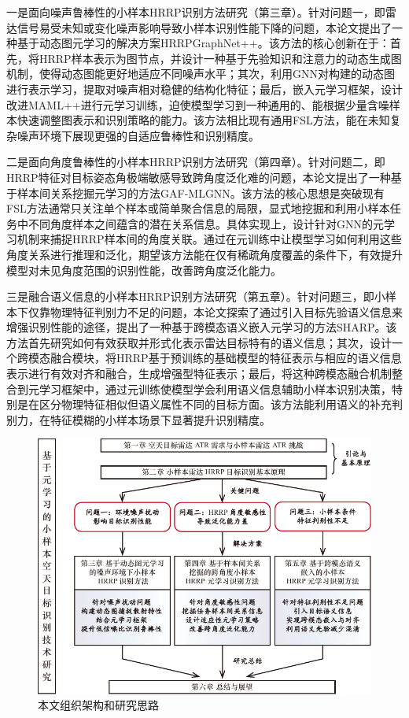 一是面向噪声鲁棒性的小样本HRRP识别方法研究（第三章）。针对问题一，即雷达信号易受未知或变化噪声影响导致小样本识别性能下降的问题，本论文提出了一种基于动态图元学习的解决方案HRRPGraphNet++。该方法的核心创新在于：首先，将HRRP样本表示为图节点，并设计一种基于先验知识和注意力的动态生成图机制，使得动态图能更好地适应不同噪声水平；其次，利用GNN对构建的动态图进行表示学习，提取对噪声相对稳健的结构化特征；最后，嵌入元学习框架，设计改进MAML++进行元学习训练，迫使模型学习到一种通用的、能根据少量含噪样本快速调整图表示和识别策略的能力。该方法相比现有通用FSL方法，能在未知复杂噪声环境下展现更强的自适应鲁棒性和识别精度。

二是面向角度鲁棒性的小样本HRRP识别方法研究（第四章）。针对问题二，即HRRP特征对目标姿态角极端敏感导致跨角度泛化难的问题，本论文提出了一种基于样本间关系挖掘元学习的方法GAF-MLGNN。该方法的核心思想是突破现有FSL方法通常只关注单个样本或简单聚合信息的局限，显式地挖掘和利用小样本任务中不同角度样本之间蕴含的潜在关系信息。具体实现上，设计针对GNN的元学习机制来捕捉HRRP样本间的角度关联。通过在元训练中让模型学习如何利用这些角度关系进行推理和泛化，期望该方法能在仅有稀疏角度覆盖的条件下，有效提升模型对未见角度范围的识别性能，改善跨角度泛化能力。

三是融合语义信息的小样本HRRP识别方法研究（第五章）。针对问题三，即小样本下仅靠物理特征判别力不足的问题，本论文探索了通过引入目标先验语义信息来增强识别性能的途径，提出了一种基于跨模态语义嵌入元学习的方法SHARP。该方法首先研究如何有效获取并形式化表示雷达目标特有的语义信息；其次，设计一个跨模态融合模块，将HRRP基于预训练的基础模型的特征表示与相应的语义信息表示进行有效对齐和融合，生成增强型特征表示；最后，将这种跨模态融合机制整合到元学习框架中，通过元训练使模型学会利用语义信息辅助小样本识别决策，特别是在区分物理特征相似但语义属性不同的目标方面。该方法能利用语义的补充判别力，在特征模糊的小样本场景下显著提升识别精度。

\begin{figure}[h!] %
    \centering
    \includegraphics[width=0.95\linewidth]{figures/framework.pdf} %
    \caption{本文组织架构和研究思路}
    \label{fig:framework}
\end{figure}

